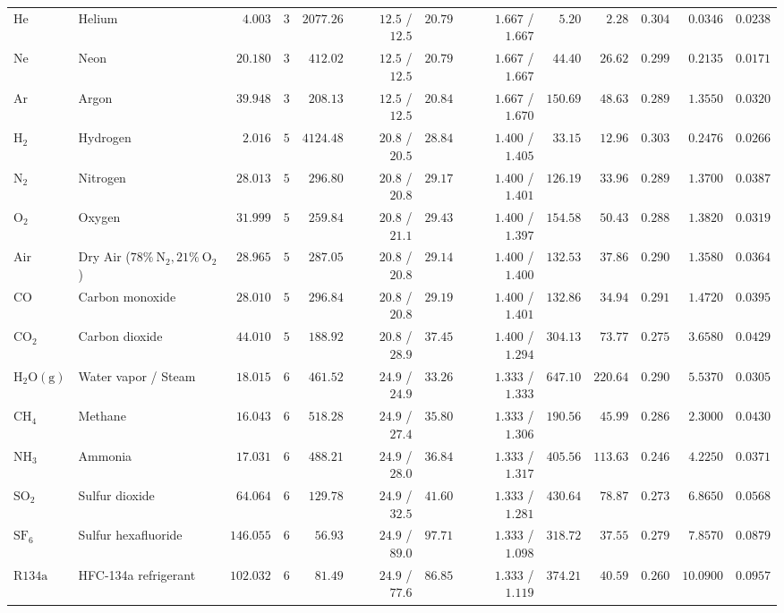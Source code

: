 {\begin{tabularx}{\linewidth}{@{}l X r c r r r r r r r r r@{}}
$\mathrm{He}$ & Helium & $4.003$ & $3$ & $2077.26$ & $12.5$ / $12.5$ & $20.79$ & $1.667$ / $1.667$ & $5.20$ & $2.28$ & $0.304$ & $0.0346$ & $0.0238$\\
$\mathrm{Ne}$ & Neon & $20.180$ & $3$ & $412.02$ & $12.5$ / $12.5$ & $20.79$ & $1.667$ / $1.667$ & $44.40$ & $26.62$ & $0.299$ & $0.2135$ & $0.0171$\\
$\mathrm{Ar}$ & Argon & $39.948$ & $3$ & $208.13$ & $12.5$ / $12.5$ & $20.84$ & $1.667$ / $1.670$ & $150.69$ & $48.63$ & $0.289$ & $1.3550$ & $0.0320$\\
$\mathrm{H_2}$ & Hydrogen & $2.016$ & $5$ & $4124.48$ & $20.8$ / $20.5$ & $28.84$ & $1.400$ / $1.405$ & $33.15$ & $12.96$ & $0.303$ & $0.2476$ & $0.0266$\\
$\mathrm{N_2}$ & Nitrogen & $28.013$ & $5$ & $296.80$ & $20.8$ / $20.8$ & $29.17$ & $1.400$ / $1.401$ & $126.19$ & $33.96$ & $0.289$ & $1.3700$ & $0.0387$\\
$\mathrm{O_2}$ & Oxygen & $31.999$ & $5$ & $259.84$ & $20.8$ / $21.1$ & $29.43$ & $1.400$ / $1.397$ & $154.58$ & $50.43$ & $0.288$ & $1.3820$ & $0.0319$\\
Air & Dry Air ($78\%\ \mathrm{N_2}, 21\%\ \mathrm{O_2}$) & $28.965$ & $5$ & $287.05$ & $20.8$ / $20.8$ & $29.14$ & $1.400$ / $1.400$ & $132.53$ & $37.86$ & $0.290$ & $1.3580$ & $0.0364$\\
$\mathrm{CO}$ & Carbon monoxide & $28.010$ & $5$ & $296.84$ & $20.8$ / $20.8$ & $29.19$ & $1.400$ / $1.401$ & $132.86$ & $34.94$ & $0.291$ & $1.4720$ & $0.0395$\\
$\mathrm{CO_2}$ & Carbon dioxide & $44.010$ & $5$ & $188.92$ & $20.8$ / $28.9$ & $37.45$ & $1.400$ / $1.294$ & $304.13$ & $73.77$ & $0.275$ & $3.6580$ & $0.0429$\\
$\mathrm{H_2O(g)}$ & Water vapor / Steam & $18.015$ & $6$ & $461.52$ & $24.9$ / $24.9$ & $33.26$ & $1.333$ / $1.333$ & $647.10$ & $220.64$ & $0.290$ & $5.5370$ & $0.0305$\\
$\mathrm{CH_4}$ & Methane & $16.043$ & $6$ & $518.28$ & $24.9$ / $27.4$ & $35.80$ & $1.333$ / $1.306$ & $190.56$ & $45.99$ & $0.286$ & $2.3000$ & $0.0430$\\
$\mathrm{NH_3}$ & Ammonia & $17.031$ & $6$ & $488.21$ & $24.9$ / $28.0$ & $36.84$ & $1.333$ / $1.317$ & $405.56$ & $113.63$ & $0.246$ & $4.2250$ & $0.0371$\\
$\mathrm{SO_2}$ & Sulfur dioxide & $64.064$ & $6$ & $129.78$ & $24.9$ / $32.5$ & $41.60$ & $1.333$ / $1.281$ & $430.64$ & $78.87$ & $0.273$ & $6.8650$ & $0.0568$\\
$\mathrm{SF_6}$ & Sulfur hexafluoride & $146.055$ & $6$ & $56.93$ & $24.9$ / $89.0$ & $97.71$ & $1.333$ / $1.098$ & $318.72$ & $37.55$ & $0.279$ & $7.8570$ & $0.0879$\\
$\mathrm{R134a}$ & HFC-134a refrigerant & $102.032$ & $6$ & $81.49$ & $24.9$ / $77.6$ & $86.85$ & $1.333$ / $1.119$ & $374.21$ & $40.59$ & $0.260$ & $10.0900$ & $0.0957$\\
\bottomrule
\end{tabularx}}
